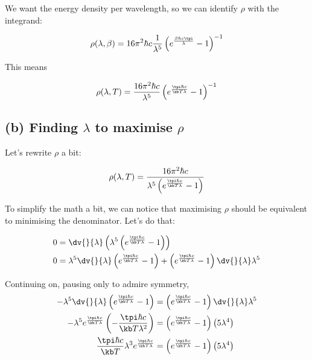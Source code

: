 \documentclass[../../PS3.tex]{subfiles}
\begin{document}
We want the energy density per wavelength, so we can identify $\rho$ with the integrand:

\begin{equation}
	\rho(\lambda,\beta) = 16 \pi^2 \hbar c \frac{1}{\lambda^5} \left(e^{ \frac{\beta \hbar c \tpi}{\lambda}} - 1\right)^{-1}
\end{equation}

This means 

\begin{equation}
	\rho(\lambda,T) =  \frac{16 \pi^2 \hbar c}{\lambda^5} \left(e^{ \frac{\tpi \hbar c }{\kb T \lambda}} - 1\right)^{-1}
\end{equation}

\subsection*{(b) Finding $\lambda$ to maximise $\rho$}

Let's rewrite $\rho$ a bit:

\begin{equation}
	\rho(\lambda,T) =  \frac{16 \pi^2 \hbar c}{\lambda^5 \left(e^{ \frac{\tpi \hbar c }{\kb T \lambda}} - 1\right)}
\end{equation}

To simplify the math a bit, we can notice that maximising $\rho$ should be equivalent to minimising the denominator. Let's do that:

\begin{align}
	0 &= \dv{}{\lambda} \left( \lambda^5 \left(e^{ \frac{\tpi \hbar c }{\kb T \lambda}} - 1\right)\right) \\
	0 &= \lambda^5 \dv{}{\lambda} \left(e^{ \frac{\tpi \hbar c }{\kb T \lambda}} - 1\right) + \left(e^{ \frac{\tpi \hbar c }{\kb T \lambda}} - 1\right)\dv{}{\lambda} \lambda^5 
\end{align}

Continuing on, pausing only to admire symmetry,
\begin{align}
	- \lambda^5 \dv{}{\lambda} \left(e^{ \frac{\tpi \hbar c }{\kb T \lambda}} - 1\right) &= \left(e^{ \frac{\tpi \hbar c }{\kb T \lambda}} - 1\right)\dv{}{\lambda} \lambda^5 \\
	- \lambda^5 e^{ \frac{\tpi \hbar c }{\kb T \lambda}} \left( -\frac{\tpi \hbar c }{\kb T \lambda^2}\right) &= \left(e^{ \frac{\tpi \hbar c }{\kb T \lambda}} - 1\right)\left(5 \lambda^4\right) \\	
	\frac{\tpi \hbar c }{\kb T } \lambda^3 e^{ \frac{\tpi \hbar c }{\kb T \lambda}}  &= \left(e^{ \frac{\tpi \hbar c }{\kb T \lambda}} - 1\right)\left(5 \lambda^4\right)
\end{align}
\end{document}

